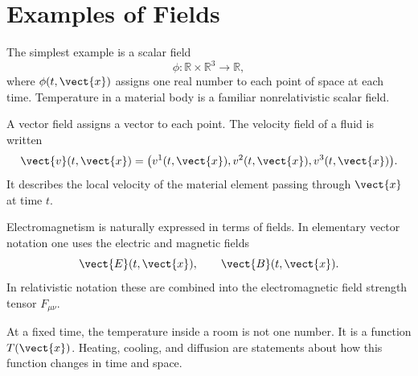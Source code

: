 \section{Examples of Fields}

The simplest example is a scalar field
\[
    \phi : \mathbb{R}\times\mathbb{R}^3 \to \mathbb{R},
\]
where \(\phi(t,\vect{x})\) assigns one real number to each point of space at
each time. Temperature in a material body is a familiar nonrelativistic scalar
field.

A vector field assigns a vector to each point. The velocity field of a fluid is
written
\[
    \vect{v}(t,\vect{x}) =
    \bigl(v^1(t,\vect{x}),v^2(t,\vect{x}),v^3(t,\vect{x})\bigr).
\]
It describes the local velocity of the material element passing through
\(\vect{x}\) at time \(t\).

Electromagnetism is naturally expressed in terms of fields. In elementary
vector notation one uses the electric and magnetic fields
\[
    \vect{E}(t,\vect{x}), \qquad \vect{B}(t,\vect{x}).
\]
In relativistic notation these are combined into the electromagnetic field
strength tensor \(F_{\mu\nu}\).

\begin{examplebox}
At a fixed time, the temperature inside a room is not one number. It is a
function \(T(\vect{x})\). Heating, cooling, and diffusion are statements about
how this function changes in time and space.
\end{examplebox}
